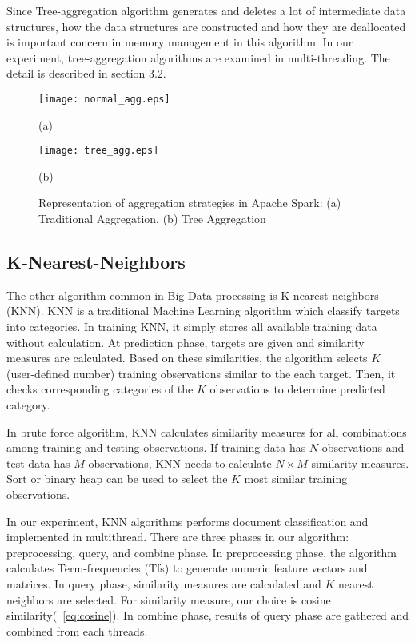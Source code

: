 Since Tree-aggregation algorithm generates and deletes a lot of intermediate data structures, 
how the data structures are constructed and how they are deallocated is important concern in memory management in this algorithm.
In our experiment, tree-aggregation algorithms are examined in multi-threading. The detail is described in section 3.2.

\begin{figure}[htb]
    \begin{minipage}[t]{0.5\linewidth}\centering
        \texttt{[image: normal\_agg.eps]}
        \medskip
        \centerline{(a)}
        \end{minipage}\hfill
        \begin{minipage}[t]{0.5\linewidth}\centering
        \texttt{[image: tree\_agg.eps]} 
        \medskip
        \centerline{(b)}
    \end{minipage}\hfill
    \caption{Representation of aggregation strategies in Apache Spark: (a) Traditional Aggregation, (b) Tree Aggregation}
    \label{fig:aggregationk_patttern}
\end{figure}

\subsection{K-Nearest-Neighbors}
\label{sec:history}
The other algorithm common in Big Data processing is K-nearest-neighbors (KNN). KNN is a traditional Machine Learning algorithm which classify targets into categories. 
In training KNN, it simply stores all available training data without calculation. At prediction phase, targets are given and similarity measures are calculated. 
Based on these similarities, the algorithm selects \(K\) (user-defined number) training observations similar to the each target. 
Then, it checks corresponding categories of the \(K\) observations to determine predicted category. 

In brute force algorithm, KNN calculates similarity measures for all combinations among training and testing observations. 
If training data has \(N\) observations and test data has \(M\) observations, KNN needs to calculate \(N \times M\) similarity measures. 
Sort or binary heap can be used to select the \(K\) most similar training observations.

In our experiment, KNN algorithms performs document classification and implemented in multithread. 
There are three phases in our algorithm: preprocessing, query, and combine phase. 
In preprocessing phase, the algorithm calculates Term-frequencies (Tfs) to generate numeric feature vectors and matrices. 
In query phase, similarity measures are calculated and \(K\) nearest neighbors are selected. 
For similarity measure, our choice is cosine similarity(~\ref{eq:cosine}). 
In combine phase, results of query phase are gathered and combined from each threads.

